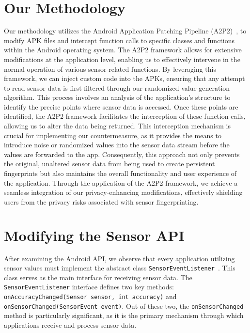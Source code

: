 \documentclass[11pt,
  oneside,openany,    %
]{scrreprt}
\begin{document}
\section{Our Methodology}
\label{sec:our_methodology}
Our methodology utilizes the Android Application Patching Pipeline (A2P2)~\cite{DBLP:conf/IEEEares/Draschbacher23}, to modify APK files and intercept function calls to specific classes and functions within the Android operating system.
The A2P2 framework allows for extensive modifications at the application level, enabling us to effectively intervene in the normal operation of various sensor-related functions.
By leveraging this framework, we can inject custom code into the APKs, ensuring that any attempt to read sensor data is first filtered through our randomized value generation algorithm.
This process involves an analysis of the application's structure to identify the precise points where sensor data is accessed.
Once these points are identified, the A2P2 framework facilitates the interception of these function calls, allowing us to alter the data being returned.
This interception mechanism is crucial for implementing our countermeasure, as it provides the means to introduce noise or randomized values into the sensor data stream before the values are forwarded to the app.
Consequently, this approach not only prevents the original, unaltered sensor data from being used to create persistent fingerprints but also maintains the overall functionality and user experience of the application.
Through the application of the A2P2 framework, we achieve a seamless integration of our privacy-enhancing modifications, effectively shielding users from the privacy risks associated with sensor fingerprinting.

\section{Modifying the Sensor API}
\label{sec:function}
After examining the Android API, we observe that every application utilizing sensor values must implement the abstract class \verb|SensorEventListener|~\cite{android_sensoreventlistener}.
This class serves as the main interface for receiving sensor data.
The \verb|SensorEventListener| interface defines two key methods: \verb|onAccuracyChanged(Sensor sensor, int accuracy)| and \verb|onSensorChanged(SensorEvent event)|.
Out of these two, the \verb|onSensorChanged| method is particularly significant, as it is the primary mechanism through which applications receive and process sensor data.
\end{document}
